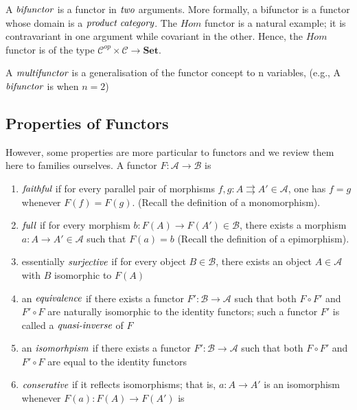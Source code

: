 \documentclass[10pt, oneside, reqno]{amsart}
\begin{document}
\begin{defn}[Bifunctor]
 A $\emph{bifunctor}$ is a functor in $\emph{two}$ arguments. More formally, a bifunctor is a functor whose
 domain is a $\emph{product category}$.
 The $Hom$ functor is a natural example; it is contravariant in one argument while covariant in the other.
 Hence, the $Hom$ functor is of the type $\mathcal{C}^{op} \times \mathcal{C} \to \textbf{Set}$.
\end{defn}

\begin{defn}[Multifunctor]
 A $\emph{multifunctor}$ is a generalisation of the functor concept to n variables, (e.g., A $\emph{bifunctor}$ is when $n=2$)
\end{defn}

\subsection{Properties of Functors} %
\label{subsec:functorsproperties}
However, some properties are more particular to functors and we review them here to families ourselves.
A functor $F : \mathcal{A} \to \mathcal{B}$ is
\begin{enumerate}
 \item $\emph{faithful}$ if for every parallel pair of morphisms $f,g : A \rightrightarrows A' \in \mathcal{A}$, one has $f = g$ whenever $F(f) = F(g)$.
 (Recall the definition of a monomorphism).
 \item $\emph{full}$ if for every morphism $b: F(A) \to F(A') \in \mathcal{B}$, there exists a morphism $a: A \to A' \in \mathcal{A}$ such that $F(a) = b$
 (Recall the definition of a epimorphism).
 \item essentially $\emph{surjective}$ if for every object $B \in \mathcal{B}$, there exists an object $A \in \mathcal{A}$ with $B$ isomorphic to $F(A)$
 \item an $\emph{equivalence}$ if there exists a functor $F': \mathcal{B} \to \mathcal{A}$ such that both $F \circ F'$ and $F' \circ F$ are naturally
 isomorphic to the identity functors; such a functor $F'$ is called a $\emph{quasi-inverse}$ of $F$
 \item an $\emph{isomorhpism}$ if there exists a functor $F': \mathcal{B} \to \mathcal{A}$ such that both $F \circ F'$ and $F' \circ F$
 are equal to the identity functors
 \item $\emph{conserative}$ if it reflects isomorphisms; that is, $a: A \to A'$ is an isomorphism whenever $F(a): F(A) \to F(A')$ is
\end{enumerate}
\end{document}
